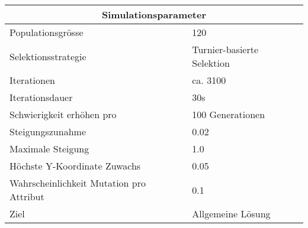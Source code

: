 
\begin{tabular}{ | l | l | }

  \hline
  \multicolumn{2}{|c|}{Simulationsparameter} \\
  \hline
  Populationsgrösse & 120 \\ \hline
  Selektionsstrategie & Turnier-basierte Selektion \\ \hline
  Iterationen & ca. 3100 \\ \hline
  Iterationsdauer & 30s \\ \hline
  Schwierigkeit erhöhen pro & 100 Generationen \\ \hline
  Steigungszunahme & 0.02 \\ \hline
  Maximale Steigung & 1.0 \\ \hline
  Höchste Y-Koordinate Zuwachs & 0.05 \\ \hline
  Wahrscheinlichkeit Mutation pro Attribut & 0.1 \\ \hline
  Ziel & Allgemeine Lösung \\ \hline

\end{tabular}
